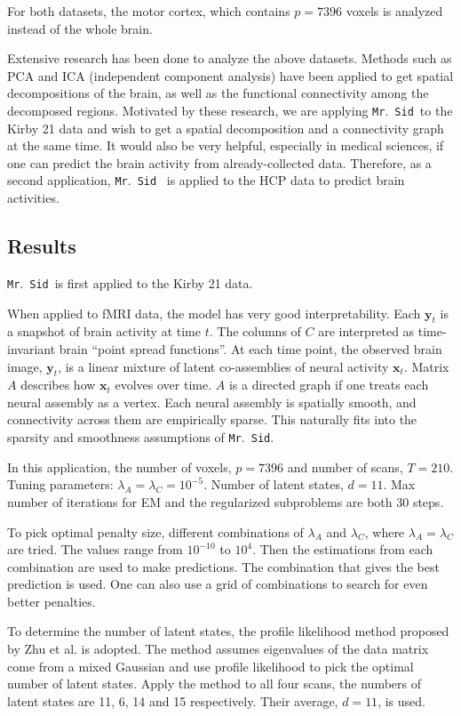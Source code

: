 \documentclass[fleqn,12pt]{article}
\newcommand{\mrsid}{{\sc \texttt{Mr}.~\texttt{Sid}}}
\providecommand{\mb}[1]{\boldsymbol{#1}}
\newcommand{\bx}{\mb{x}}
\newcommand{\by}{\mb{y}}
\begin{document}
For both datasets, the motor cortex, which contains $p=7396$ voxels is analyzed instead of the whole brain.

Extensive research has been done to analyze the above datasets. Methods such as PCA and ICA (independent component analysis) have been applied to get spatial decompositions of the brain, as well as the functional connectivity among the decomposed regions. Motivated by these research, we are applying \mrsid~to the Kirby 21 data and wish to get a spatial decomposition and a connectivity graph at the same time. It would also be very helpful, especially in medical sciences, if one can predict the brain activity from already-collected data. Therefore, as a second application, \mrsid~ is applied to the HCP data to predict brain activities.


\subsection{Results}

\mrsid~is first applied to the Kirby 21 data.

When applied to fMRI data, the model has very good interpretability. Each $\by_t$ is a snapshot of brain activity at time $t$. The columns of $C$ are interpreted as time-invariant brain ``point spread functions''. At each time point, the observed brain image, $\by_t$, is a linear mixture of latent co-assemblies of neural activity  $\bx_t$. Matrix $A$ describes how $\bx_t$ evolves over time. $A$ is a directed graph if one treats each neural assembly as a vertex. Each neural assembly is spatially smooth, and connectivity across them are empirically sparse. This naturally fits into the sparsity and smoothness assumptions of \mrsid.


In this application, the number of voxels, $p = 7396$ and number of scans, $T = 210$. Tuning parameters: $\lambda_A = \lambda_C = 10^{-5}$. Number of latent states, $d = 11$. Max number of iterations for EM and the regularized subproblems are both 30 steps.

To pick optimal penalty size, different combinations of $\lambda_A$ and $\lambda_C$, where $\lambda_A = \lambda_C$ are tried. The values range from $10^{-10}$ to $10^{4}$. Then the estimations from each combination are used to make predictions. The combination that gives the best prediction is used. One can also use a grid of combinations to search for even better penalties. 

To determine the number of latent states, the profile likelihood method proposed by Zhu et al. \citep{zhu2006automatic} is adopted. The method assumes eigenvalues of the data matrix come from a mixed Gaussian and use profile likelihood to pick the optimal number of latent states. Apply the method to all four scans, the numbers of latent states are 11, 6, 14 and 15 respectively. Their average, $d=11$, is used.
\end{document}
